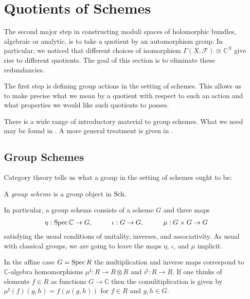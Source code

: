 \documentclass[12pt]{ociamthesis}  %
\begin{document}
\section{Quotients of Schemes}

The second major step in constructing moduli spaces of holomorphic
bundles, algebraic or analytic, is to take a quotient by an automorphism
group. In particular, we noticed that different choices of isomorphism
$\Gamma(X,\mathscr F)\cong\mathbb{C}^N$ give rise to different quotients.
The goal of this section is to eliminate these redundancies.

The first step is defining group actions in the setting of schemes.
This allows us to make precise what we mean by a quotient with
respect to such an action and what properties we would like such
quotients to posses.

There is a wide range of introductory material to group schemes.
What we need may be found in \cite{hoskins2016}. A more general
treatment is given in \cite{milne2017}.

\subsection{Group Schemes}

Category theory tells us what a group in the
setting of schemes ought to be:

\begin{definition}
  A \emph{group scheme} is a group object in $\operatorname{Sch}$.
\end{definition}
In particular, a group scheme consists of a scheme $G$ and three maps
\begin{align}\label{eq:group_maps}
  \eta:\operatorname{Spec}\mathbb{C}\to G,\hspace{1cm}
  \iota:G\to G,\hspace{1cm}
  \mu:G\times G\to G
\end{align}
satisfying the usual conditions of unitality, inverses, and associativity.
As usual with classical groups, we are going to leave the maps
$\eta$, $\iota$, and $\mu$ implicit.

In the affine case $G = \operatorname{Spec} R$ the multiplication and inverse maps
correspond to $\mathbb{C}$-algebra homomorphisms
$\mu^\sharp : R \to R\otimes R$ and $i^\sharp : R\to R$.
If one thinks of elements $f\in R$ as functions $G\to\mathbb C$
then the comulitiplication is given by $\mu^\sharp(f)(g,h) = f(\mu(g,h))$
for $f\in R$ and $g,h\in G$.
\end{document}

